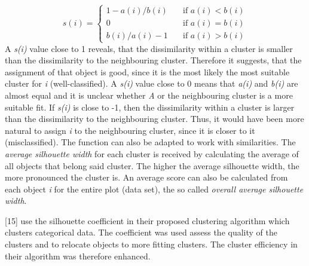   \[ s(i) =
  \begin{cases}
    1 - a(i)/b(i)       & \quad \text{if } a(i) < b(i)\\
    0       & \quad \text{if } a(i) = b(i)\\
 b(i)/a(i) - 1      & \quad \text{if } a(i) > b(i)

  \end{cases}
\]
A \textit{s(i)} value close to 1 reveals, that the dissimilarity within a cluster is smaller than the dissimilarity to the neighbouring cluster. Therefore it suggests, that the assignment of that object is good, since it is the most likely the most suitable cluster for \textit{i} (well-classified). A \textit{s(i)} value close to 0 means that \textit{a(i)} and \textit{b(i)} are almost equal and it is unclear whether \textit{A} or the neighbouring cluster is a more suitable fit. If \textit{s(i)} is close to -1, then the dissimilarity within a cluster is larger than the dissimilarity to the neighbouring cluster. Thus, it would have been more natural to assign \textit{i} to the neighbouring cluster, since it is closer to it (misclassified). The function can also be adapted to work with similarities.
The \textit{average silhouette width} for each cluster is received by calculating the average of all objects that belong said cluster. The higher the average silhouette width, the more pronounced the cluster is. An average score can also be calculated from each object \textit{i} for the entire plot (data set), the so called \textit{overall average silhouette width}. 

\textcite{silhouetteRelocatingMeasure}[15] use the silhouette coefficient in their proposed clustering algorithm which clusters categorical data. The coefficient was used assess the quality of the clusters and to relocate objects to more fitting clusters. The cluster efficiency in their algorithm was therefore enhanced.


